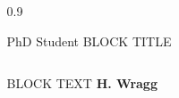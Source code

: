 \documentclass[final]{beamer}
\theoremstyle{plain}
\theoremstyle{definition}
\theoremstyle{remark}
\newlength{\sepwid}
\newlength{\onecolwid}
\begin{document}
\begin{frame}[t] %

\begin{columns}[t] %

\begin{column}{\sepwid}\end{column} %

\begin{column}{0.9\onecolwid} %


    \begin{mdframed}[backgroundcolor=white, userdefinedwidth=0.999999\linewidth]
    \centering
    \center
    \end{mdframed}
    \vspace{1.75cm} %

\begin{alertblock}{PhD Student BLOCK TITLE}
\begin{columns}
\begin{column}{0.65\linewidth}
BLOCK TEXT
\textbf{H. Wragg}


\end{column}
\end{columns}
\end{alertblock}
\end{column}
\end{columns}
\end{frame}
\end{document}

